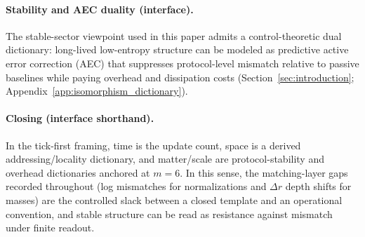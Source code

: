 \paragraph{Stability and AEC duality (interface).}
\InterfaceTag The stable-sector viewpoint used in this paper admits a control-theoretic dual dictionary: long-lived low-entropy structure can be modeled as predictive active error correction (AEC) that suppresses protocol-level mismatch relative to passive baselines while paying overhead and dissipation costs (Section~\ref{sec:introduction}; Appendix~\ref{app:isomorphism_dictionary}).

\paragraph{Closing (interface shorthand).}
\InterfaceTag In the tick-first framing, time is the update count, space is a derived addressing/locality dictionary, and matter/scale are protocol-stability and overhead dictionaries anchored at $m=6$.
In this sense, the matching-layer gaps recorded throughout (log mismatches for normalizations and $\Delta r$ depth shifts for masses) are the controlled slack between a closed template and an operational convention, and stable structure can be read as resistance against mismatch under finite readout.


